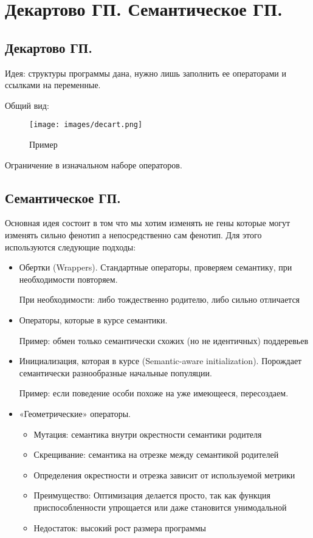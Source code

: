 \section{Декартово ГП. Семантическое ГП.}

\subsection*{Декартово ГП.}
Идея: структуры программы дана, нужно лишь заполнить ее операторами и ссылками на переменные.

Общий вид:
\begin{figure}[h]
\centering
\texttt{[image: images/decart.png]}
\caption{Пример}
\label{fig:mpr}
\end{figure}

Ограничение в изначальном наборе операторов.

\subsection*{Семантическое ГП.}

Основная идея состоит в том что мы хотим изменять не гены которые могут изменять сильно фенотип а непосредственно сам фенотип. 
Для этого используются следующие подходы:
\begin{itemize}
	\item Обертки (Wrappers). Стандартные операторы, проверяем семантику, при необходимости повторяем.
	
	При необходимости: либо тождественно родителю, либо сильно отличается
	\item Операторы, которые в курсе семантики.
	
	Пример: обмен только семантически схожих (но не идентичных) поддеревьев
	\item Инициализация, которая в курсе (Semantic-aware initialization). Порождает семантически разнообразные начальные популяции.
	
	Пример: если поведение особи похоже на уже имеющееся, пересоздаем.
	\item «Геометрические» операторы. 
	\begin{itemize}
		\item Мутация: семантика внутри окрестности семантики родителя
		\item Скрещивание: семантика на отрезке между семантикой родителей
		\item Определения окрестности и отрезка зависит от используемой метрики
		\item Преимущество: Оптимизация делается просто, так как функция приспособленности упрощается или даже становится унимодальной
		\item Недостаток: высокий рост размера программы
	\end{itemize}
\end{itemize}
